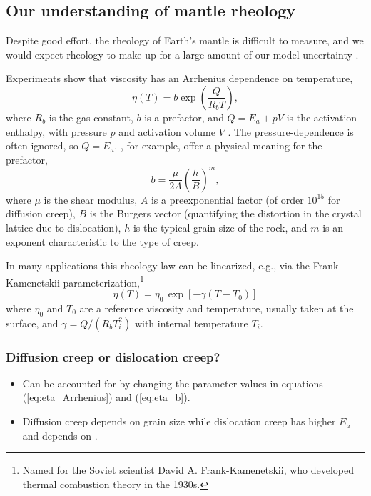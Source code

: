 \subsection{Our understanding of mantle rheology}

Despite good effort, the rheology of Earth's mantle is difficult to measure, and we would expect rheology to make up for a large amount of our model uncertainty \citep{Dumoulin2013}. 

Experiments show that viscosity has an Arrhenius dependence on temperature,
\begin{equation}\label{eq:eta_Arrhenius}
\eta(T) = b \exp\left(\frac{Q}{R_b T}\right),
\end{equation}
where $R_b$ is the gas constant, $b$ is a prefactor, and $Q = E_a + pV$ is the activation enthalpy, with pressure $p$ and activation volume $V$ \citep{Karato1993, Korenaga2008, Karato2010, Mullet2015, Jain2019}. The pressure-dependence is often ignored, so $Q = E_a$. \citet{Karato1993}, for example, offer a physical meaning for the prefactor,
\begin{equation}\label{eq:eta_b}
b = \frac{\mu}{2 A} \left(\frac{h}{B}\right)^m,
\end{equation}
where $\mu$ is the shear modulus, $A$ is a preexponential factor (of order $10^{15}$ for diffusion creep), $B$ is the Burgers vector (quantifying the distortion in the crystal lattice due to dislocation), $h$ is the typical grain size of the rock, and $m$ is an exponent characteristic to the type of creep.

In many applications this rheology law can be linearized, e.g., via the Frank-Kamenetskii parameterization,\footnote{Named for the Soviet scientist David A. Frank-Kamenetskii, who developed thermal combustion theory in the 1930s.}
\begin{equation}
\eta(T) = \eta_0 \, \exp{\left[-\gamma \left(T - T_0\right)\right]}
\end{equation}
where $\eta_0$ and $T_0$ are a reference viscosity and temperature, usually taken at the surface, and $\gamma = Q/(R_b T_i^2)$ with internal temperature $T_i$.

\subsubsection{Diffusion creep or dislocation creep?}

\begin{itemize}
\item Can be accounted for by changing the parameter values in equations (\ref{eq:eta_Arrhenius}) and (\ref{eq:eta_b}).
\item Diffusion creep depends on grain size while dislocation creep has higher $E_a$ and depends on \citep{Turcotte2014}.
\end{itemize} 

